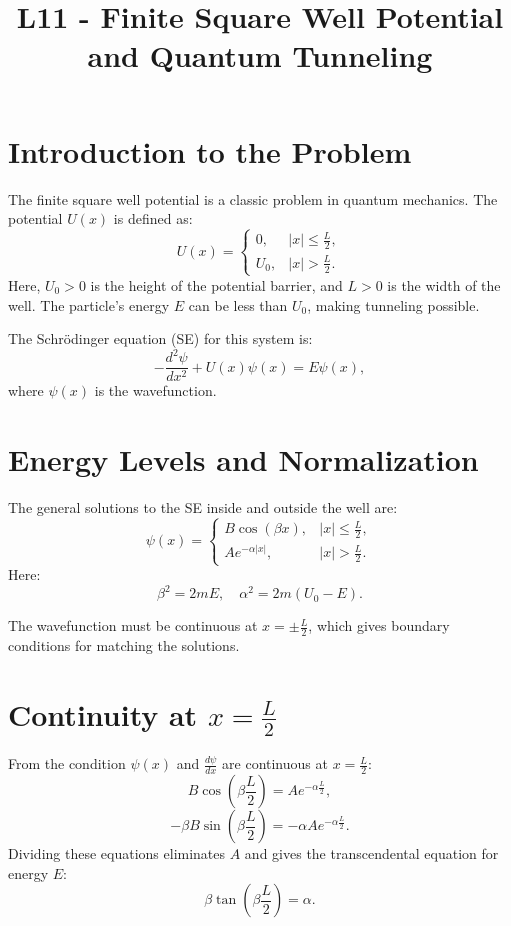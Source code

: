 \documentclass[a4paper,12pt]{article}
\begin{document}
\title{L11 - Finite Square Well Potential and Quantum Tunneling}
\author{}
\date{}
\maketitle

\begin{multicols}{2}

\section{Introduction to the Problem}
The finite square well potential is a classic problem in quantum mechanics. The potential \( U(x) \) is defined as:
\[
U(x) = 
\begin{cases} 
0, & |x| \leq \frac{L}{2}, \\ 
U_0, & |x| > \frac{L}{2}.
\end{cases}
\]
Here, \( U_0 > 0 \) is the height of the potential barrier, and \( L > 0 \) is the width of the well. The particle’s energy \( E \) can be less than \( U_0 \), making tunneling possible.

The Schrödinger equation (SE) for this system is:
\[
-\frac{d^2\psi}{dx^2} + U(x)\psi(x) = E\psi(x),
\]
where \( \psi(x) \) is the wavefunction.

\section{Energy Levels and Normalization}
The general solutions to the SE inside and outside the well are:
\[
\psi(x) = 
\begin{cases} 
B\cos(\beta x), & |x| \leq \frac{L}{2}, \\ 
Ae^{-\alpha|x|}, & |x| > \frac{L}{2}.
\end{cases}
\]
Here:
\[
\beta^2 = 2mE, \quad \alpha^2 = 2m(U_0 - E).
\]

The wavefunction must be continuous at \( x = \pm\frac{L}{2} \), which gives boundary conditions for matching the solutions.

\section{Continuity at \( x = \frac{L}{2} \)}
From the condition \( \psi(x) \) and \( \frac{d\psi}{dx} \) are continuous at \( x = \frac{L}{2} \):
\[
B\cos\left(\beta \frac{L}{2}\right) = A e^{-\alpha \frac{L}{2}},
\]
\[
-\beta B\sin\left(\beta \frac{L}{2}\right) = -\alpha A e^{-\alpha \frac{L}{2}}.
\]
Dividing these equations eliminates \( A \) and gives the transcendental equation for energy \( E \):
\[
\beta \tan\left(\beta \frac{L}{2}\right) = \alpha.
\]


\end{multicols}
\end{document}
